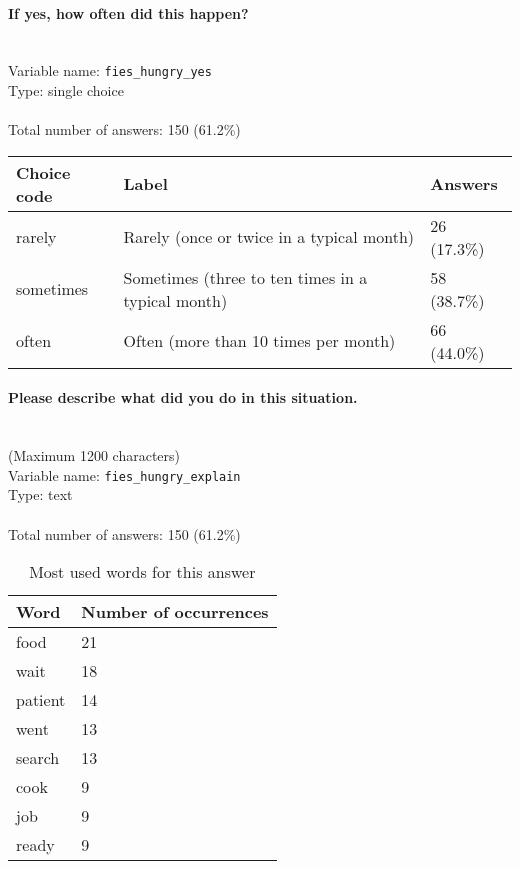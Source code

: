 \documentclass[11.5pt, a4paper]{scrartcl}
\begin{document}
\paragraph{If yes, how often did this happen? }
\  \\Variable name: \texttt{fies\_hungry\_yes}\\
Type: single choice\\
\\Total number of answers: 150 (61.2\%)
\\[0.2em] \begin{tabular}{p{4cm}|p{8cm}|p{3cm}}
Choice code & Label & Answers \\
\hline
rarely & Rarely (once or twice in a typical month)& \cellcolor{color0}26 (17.3\%)\\
\cellcolor{mygray} sometimes & \cellcolor{mygray}Sometimes (three to ten times in a typical month) & \cellcolor{color1}58 (38.7\%)\\
often & Often (more than 10 times per month)& \cellcolor{color2}66 (44.0\%)\\
\end{tabular}
\paragraph{Please describe what did you do in this situation.}
\ \\ {\small (Maximum 1200 characters)}
\  \\Variable name: \texttt{fies\_hungry\_explain}\\
Type: text\\
\\Total number of answers: 150 (61.2\%)
\\[0.2em]\begin{table}[H]
 \begin{tabular}{p{4cm}|p{8cm}}
Word & Number of occurrences  \\
\hline
\cellcolor{mygray}food&\cellcolor{mygray}21\\
\hline
wait&18\\
\hline
\cellcolor{mygray}patient&\cellcolor{mygray}14\\
\hline
went&13\\
\hline
\cellcolor{mygray}search&\cellcolor{mygray}13\\
\hline
cook&9\\
\hline
\cellcolor{mygray}job&\cellcolor{mygray}9\\
\hline
ready&9\\
\hline
\end{tabular}
\caption{\label{tab:table-name} Most used words for this answer}
\end{table}
\end{document}
